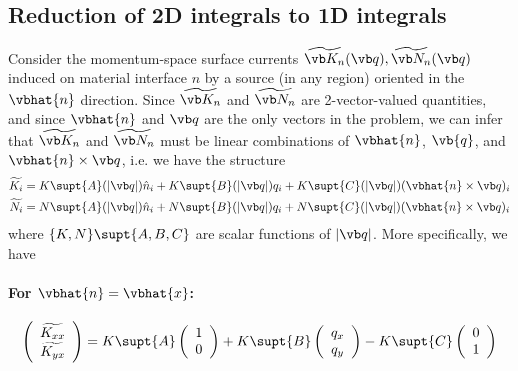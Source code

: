 \documentclass[letterpaper]{article}
\renewcommand{\wt}{\widetilde}
\begin{document}
\newpage
\subsection{Reduction of 2D integrals to 1D integrals}
\label{TwoDToOneDSection}

Consider the momentum-space surface currents
$\wt{\vb K_n}(\vb q), \wt{\vb N_n}(\vb q)$
induced on material interface $n$ by a source (in any region)
oriented in the $\vbhat{n}$ direction.
Since $\wt{\vb K_n}$ and $\wt{\vb N_n}$ are 2-vector-valued
quantities, and since $\vbhat{n}$ and $\vb q$ are the
only vectors in the problem, 
we can infer that
$\wt{\vb K_n}$ and $\wt{\vb N_n}$ must be linear
combinations of $\vbhat{n}$, $\vb{q}$, and $\vbhat{n}\times \vb q$,
i.e. we have the structure
\begin{align*}
 \wt{K_i} &= 
    K\supt{A}(|\vb q|) \hat{n}_i
   +K\supt{B}(|\vb q|) q_i
   +K\supt{C}(|\vb q|) (\vbhat{n} \times \vb q)_i
\\
 \wt{N_i} &= 
    N\supt{A}(|\vb q|) \hat{n}_i
   +N\supt{B}(|\vb q|) q_i
   +N\supt{C}(|\vb q|) (\vbhat{n} \times \vb q)_i
\end{align*}
where $\{K,N\}\supt{A,B,C}$ are scalar functions of $|\vb q|$. More
specifically, we have
\paragraph{For $\vbhat{n}=\vbhat{x}$:}
$$ \left(\begin{array}{c} \wt{K_{xx}} \\ \wt{K_{yx}} \end{array}\right)
   = K\supt{A} \left(\begin{array}{c} 1   \\ 0   \end{array}\right)
    +K\supt{B} \left(\begin{array}{c} q_x \\ q_y \end{array}\right)
    -K\supt{C} \left(\begin{array}{c} 0   \\ 1   \end{array}\right)
$$
\end{document}
